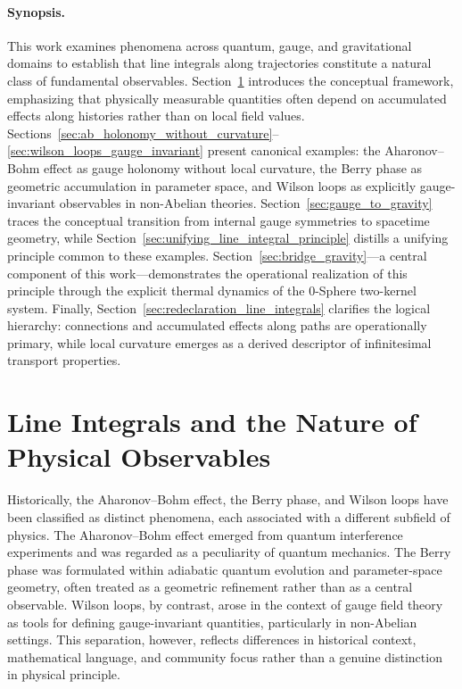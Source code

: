 \documentclass[%
 reprint,
 amsmath,amssymb,
 aps,
 prb,
]{revtex4-2}
\numberwithin{equation}{section}
\begin{document}
\paragraph*{Synopsis.}
This work examines phenomena across quantum, gauge, and gravitational domains 
to establish that line integrals along trajectories constitute a natural class 
of fundamental observables. 
Section~\ref{sec:line_integrals_observables} introduces the conceptual framework, 
emphasizing that physically measurable quantities often depend on accumulated 
effects along histories rather than on local field values. 
Sections~\ref{sec:ab_holonomy_without_curvature}--\ref{sec:wilson_loops_gauge_invariant} 
present canonical examples: the Aharonov--Bohm effect as gauge holonomy without 
local curvature, the Berry phase as geometric accumulation in parameter space, 
and Wilson loops as explicitly gauge-invariant observables in non-Abelian theories. 
Section~\ref{sec:gauge_to_gravity} traces the conceptual transition from internal 
gauge symmetries to spacetime geometry, while 
Section~\ref{sec:unifying_line_integral_principle} distills a unifying principle 
common to these examples. 
Section~\ref{sec:bridge_gravity}---a central component of this work---demonstrates 
the operational realization of this principle through the explicit thermal dynamics 
of the 0-Sphere two-kernel system. 
Finally, Section~\ref{sec:redeclaration_line_integrals} clarifies the logical 
hierarchy: connections and accumulated effects along paths are operationally 
primary, while local curvature emerges as a derived descriptor of infinitesimal 
transport properties.


\section{Line Integrals and the Nature of Physical Observables}
\label{sec:line_integrals_observables}

Historically, the Aharonov--Bohm effect, the Berry phase, and Wilson loops have been classified as distinct phenomena, each associated with a different subfield of physics. The Aharonov--Bohm effect emerged from quantum interference experiments and was regarded as a peculiarity of quantum mechanics. The Berry phase was formulated within adiabatic quantum evolution and parameter-space geometry, often treated as a geometric refinement rather than as a central observable. Wilson loops, by contrast, arose in the context of gauge field theory as tools for defining gauge-invariant quantities, particularly in non-Abelian settings. This separation, however, reflects differences in historical context, mathematical language, and community focus rather than a genuine distinction in physical principle.
\end{document}
